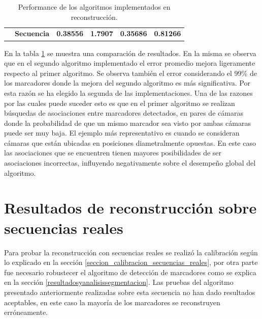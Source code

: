 \begin{table}[h]
\begin{tabular}{cc|c|c|c|c|}
\multicolumn{1}{l|}{}                                                         & \textbf{Secuencia }                                            & \textbf{0.38556 }                                                         & \textbf{1.7907    }                                                    & \textbf{0.35686}                                                         &\textbf{ 0.81266}                                                       \\ \cline{2-6} 
\end{tabular}
\caption{Performance de los algoritmos implementados en reconstrucción. }
\label{table_performance_reconstruccion}
\end{table}

En la tabla \ref{table_performance_reconstruccion} se muestra una comparación de resultados. En la misma se observa que en el segundo algoritmo implementado el error promedio mejora ligeramente respecto al primer algoritmo. Se observa también el error considerando el 99\% de los marcadores donde la mejora del segundo algoritmo es más significativa. Por esta razón se ha elegido la segunda de las implementaciones.
Una de las razones por las cuales puede suceder esto es que en el primer algoritmo se realizan búsquedas de asociaciones entre marcadores detectados, en pares de cámaras donde la probabilidad de que un mismo marcador sea visto por ambas cámaras puede ser muy baja. El ejemplo más representativo es cuando se consideran cámaras que están  ubicadas en posiciones diametralmente opuestas. En este caso las asociaciones que se encuentren tienen mayores posibilidades de ser asociaciones incorrectas, influyendo negativamente sobre el desempeño global del algoritmo. 



\section{Resultados de reconstrucción sobre secuencias reales}

Para probar la reconstrucción con secuencias reales se realizó la calibración según lo explicado en la sección \ref{seccion_calibracion_secuencias_reales}, por otra parte fue necesario robustecer el algoritmo de detección de marcadores como se explica en la sección \ref{resultadosyanalisissegmentacion}. Las pruebas del algoritmo presentado anteriormente realizadas sobre esta secuencia no han dado resultados aceptables, en este caso la mayoría de los marcadores se reconstruyen erróneamente. 


